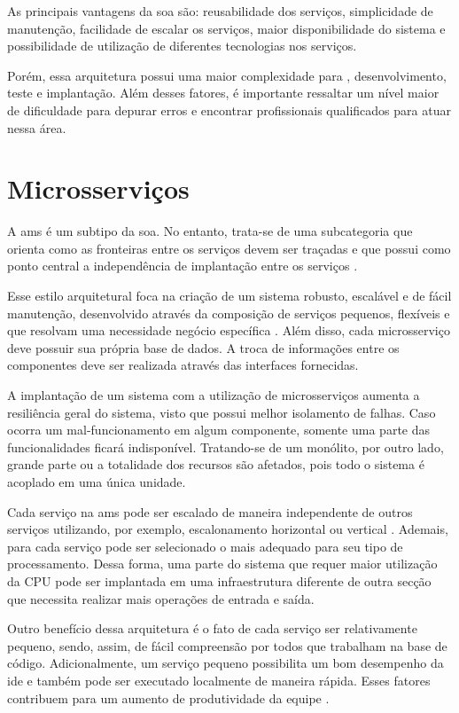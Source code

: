 As principais vantagens da \acrshort{soa} são: reusabilidade dos serviços, simplicidade de manutenção, facilidade de escalar os serviços, maior disponibilidade do sistema e possibilidade de utilização de diferentes tecnologias nos serviços.

Porém, essa arquitetura possui uma maior complexidade para , desenvolvimento, teste e implantação. Além desses fatores, é importante ressaltar um nível maior de dificuldade para depurar erros e encontrar profissionais qualificados para atuar nessa área.

\section{Microsserviços} 
A \acrfull{ams} é um subtipo da \acrshort{soa}. No entanto, trata-se de uma subcategoria que orienta como as fronteiras entre os serviços devem ser traçadas e que possui como ponto central a independência de implantação entre os serviços \cite{buildingMicroservices}.

Esse estilo arquitetural foca na criação de um sistema robusto, escalável e de fácil manutenção, desenvolvido através da composição de serviços pequenos, flexíveis e que resolvam uma necessidade negócio específica \cite{buildingMicroservices}. Além disso, cada microsserviço deve possuir sua própria base de dados. A troca de informações entre os componentes deve ser realizada através das interfaces fornecidas.

A implantação de um sistema com a utilização de microsserviços aumenta a resiliência geral do sistema, visto que possui melhor isolamento de falhas. Caso ocorra um mal-funcionamento em algum componente, somente uma parte das funcionalidades ficará indisponível. Tratando-se de um monólito, por outro lado, grande parte ou a totalidade dos recursos são afetados, pois todo o sistema é acoplado em uma única unidade.

Cada serviço na \acrshort{ams} pode ser escalado de maneira independente de outros serviços utilizando, por exemplo, escalonamento horizontal ou vertical \cite{richardson2018microservices}. Ademais, para cada serviço pode ser selecionado o  mais adequado para seu tipo de processamento. Dessa forma, uma parte do sistema que requer maior utilização da CPU pode ser implantada em uma infraestrutura diferente de outra secção que necessita realizar mais operações de entrada e saída.

Outro benefício dessa arquitetura é o fato de cada serviço ser relativamente pequeno, sendo, assim, de fácil compreensão por todos que trabalham na base de código. Adicionalmente, um serviço pequeno possibilita um bom desempenho da \acrshort{ide} e também pode ser executado localmente de maneira rápida. Esses fatores contribuem para um aumento de produtividade da equipe \cite{richardson2018microservices}.

